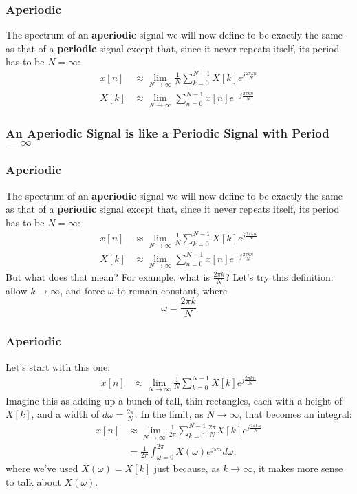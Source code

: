 \documentclass{beamer}
\begin{document}
\begin{frame}
  \frametitle{Aperiodic}

  The spectrum of an {\bf aperiodic} signal we  will now define to be exactly  the same
  as that of a {\bf periodic} signal except that, since it never repeats itself, its
  period has to be $N=\infty$:
  \begin{align*}
    x[n] &\approx \lim_{N\rightarrow\infty} \frac{1}{N}\sum_{k=0}^{N-1} X[k] e^{j\frac{2\pi kn}{N}}\\
    X[k] &\approx \lim_{N\rightarrow\infty} \sum_{n=0}^{N-1} x[n] e^{-j\frac{2\pi kn}{N}}
  \end{align*}
\end{frame}

\begin{frame}
  \frametitle{An Aperiodic Signal is like a Periodic Signal with Period$=\infty$}

  \centerline{}
\end{frame}

\begin{frame}
  \frametitle{Aperiodic}

  The spectrum of an {\bf aperiodic} signal we  will now define to be exactly  the same
  as that of a {\bf periodic} signal except that, since it never repeats itself, its
  period has to be $N=\infty$:
  \begin{align*}
    x[n] &\approx \lim_{N\rightarrow\infty} \frac{1}{N}\sum_{k=0}^{N-1} X[k] e^{j\frac{2\pi kn}{N}}\\
    X[k] &\approx \lim_{N\rightarrow\infty} \sum_{n=0}^{N-1} x[n] e^{-j\frac{2\pi kn}{N}}
  \end{align*}
  But what does that mean?  For example, what is $\frac{2\pi k}{N}$?
  Let's try this definition: allow $k\rightarrow\infty$, and force
  $\omega$ to remain constant, where
  \[
  \omega = \frac{2\pi  k}{N}
  \]
\end{frame}

\begin{frame}
  \frametitle{Aperiodic}

  Let's start with this one:
  \begin{align*}
    x[n] &\approx \lim_{N\rightarrow\infty} \frac{1}{N}\sum_{k=0}^{N-1} X[k] e^{j\frac{2\pi kn}{N}}
  \end{align*}
  Imagine this as adding up a bunch of tall, thin rectangles, each with a height of $X[k]$, and a
  width of $d\omega = \frac{2\pi}{N}$.    In the  limit, as $N\rightarrow\infty$, that becomes
  an integral:
  \begin{align*}
    x[n] &\approx\lim_{N\rightarrow\infty}\frac{1}{2\pi}\sum_{k=0}^{N-1}\frac{2\pi}{N} X[k] e^{j\frac{2\pi kn}{N}}\\
    &=\frac{1}{2\pi}\int_{\omega=0}^{2\pi}X(\omega) e^{j\omega n}d\omega,
  \end{align*}
  where we've  used $X(\omega)=X[k]$ just because, as $k\rightarrow\infty$,
  it makes more sense to talk about $X(\omega)$.
\end{frame}
\end{document}
